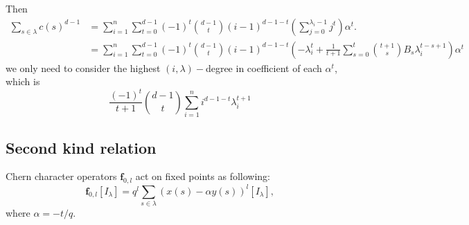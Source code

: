 \documentclass{article}
\newcommand{\lr}[1]{\left({#1}\right)}
\begin{document}
Then 
\[
\begin{aligned}
\sum_{s\in\lambda}c(s)^{d-1} &= \sum_{i=1}^{n}\sum_{t=0}^{d-1}(-1)^t\binom{d-1}{t}(i-1)^{d-1-t}\lr{\sum_{j=0}^{\lambda_i-1}j^t}\alpha^t.\\
&= \sum_{i=1}^{n}\sum_{t=0}^{d-1}(-1)^t\binom{d-1}{t}(i-1)^{d-1-t}\lr{-\lambda_i^t + \frac{1}{t+1}\sum_{s=0}^t\binom{t+1}{s}B_s\lambda_i^{t-s+1}}\alpha^t
\end{aligned}
\]
we only need to consider the highest $(i,\lambda)-$degree in coefficient of each $\alpha^t$, which is 
\[\frac{(-1)^t}{t+1}\binom{d-1}{t}\sum_{i=1}^{n}i^{d-1-t}\lambda_i^{t+1}\] 
\subsection{Second kind relation}
Chern character operators $\mathbf{f}_{0,l}$ act on fixed points as following:
\[
\mathbf{f}_{0,l}[I_\lambda]=q^{l}\sum_{s\in\lambda}(x(s)-\alpha y(s))^l[I_\lambda],
\]
where $\alpha = -t/q$.
\end{document}
